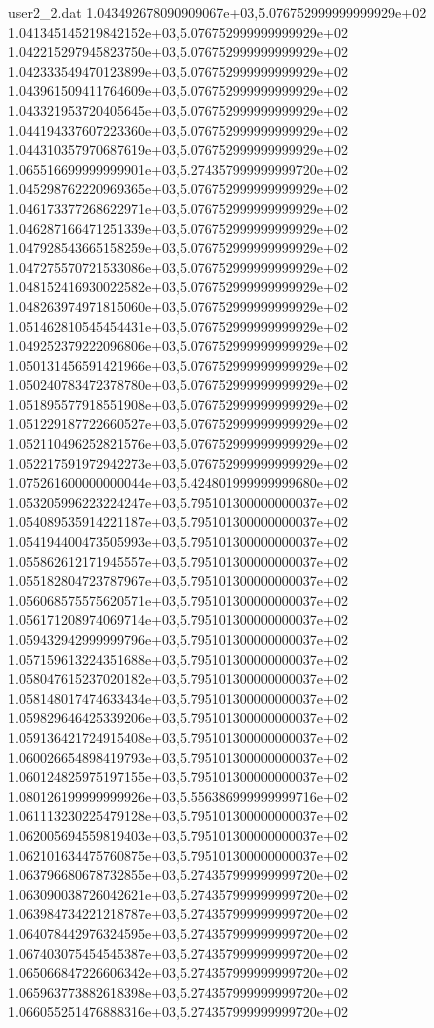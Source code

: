 \begin{filecontents}{user2_2.dat}
1.043492678090909067e+03,5.076752999999999929e+02
1.041345145219842152e+03,5.076752999999999929e+02
1.042215297945823750e+03,5.076752999999999929e+02
1.042333549470123899e+03,5.076752999999999929e+02
1.043961509411764609e+03,5.076752999999999929e+02
1.043321953720405645e+03,5.076752999999999929e+02
1.044194337607223360e+03,5.076752999999999929e+02
1.044310357970687619e+03,5.076752999999999929e+02
1.065516699999999901e+03,5.274357999999999720e+02
1.045298762220969365e+03,5.076752999999999929e+02
1.046173377268622971e+03,5.076752999999999929e+02
1.046287166471251339e+03,5.076752999999999929e+02
1.047928543665158259e+03,5.076752999999999929e+02
1.047275570721533086e+03,5.076752999999999929e+02
1.048152416930022582e+03,5.076752999999999929e+02
1.048263974971815060e+03,5.076752999999999929e+02
1.051462810545454431e+03,5.076752999999999929e+02
1.049252379222096806e+03,5.076752999999999929e+02
1.050131456591421966e+03,5.076752999999999929e+02
1.050240783472378780e+03,5.076752999999999929e+02
1.051895577918551908e+03,5.076752999999999929e+02
1.051229187722660527e+03,5.076752999999999929e+02
1.052110496252821576e+03,5.076752999999999929e+02
1.052217591972942273e+03,5.076752999999999929e+02
1.075261600000000044e+03,5.424801999999999680e+02
1.053205996223224247e+03,5.795101300000000037e+02
1.054089535914221187e+03,5.795101300000000037e+02
1.054194400473505993e+03,5.795101300000000037e+02
1.055862612171945557e+03,5.795101300000000037e+02
1.055182804723787967e+03,5.795101300000000037e+02
1.056068575575620571e+03,5.795101300000000037e+02
1.056171208974069714e+03,5.795101300000000037e+02
1.059432942999999796e+03,5.795101300000000037e+02
1.057159613224351688e+03,5.795101300000000037e+02
1.058047615237020182e+03,5.795101300000000037e+02
1.058148017474633434e+03,5.795101300000000037e+02
1.059829646425339206e+03,5.795101300000000037e+02
1.059136421724915408e+03,5.795101300000000037e+02
1.060026654898419793e+03,5.795101300000000037e+02
1.060124825975197155e+03,5.795101300000000037e+02
1.080126199999999926e+03,5.556386999999999716e+02
1.061113230225479128e+03,5.795101300000000037e+02
1.062005694559819403e+03,5.795101300000000037e+02
1.062101634475760875e+03,5.795101300000000037e+02
1.063796680678732855e+03,5.274357999999999720e+02
1.063090038726042621e+03,5.274357999999999720e+02
1.063984734221218787e+03,5.274357999999999720e+02
1.064078442976324595e+03,5.274357999999999720e+02
1.067403075454545387e+03,5.274357999999999720e+02
1.065066847226606342e+03,5.274357999999999720e+02
1.065963773882618398e+03,5.274357999999999720e+02
1.066055251476888316e+03,5.274357999999999720e+02

\end{filecontents}
